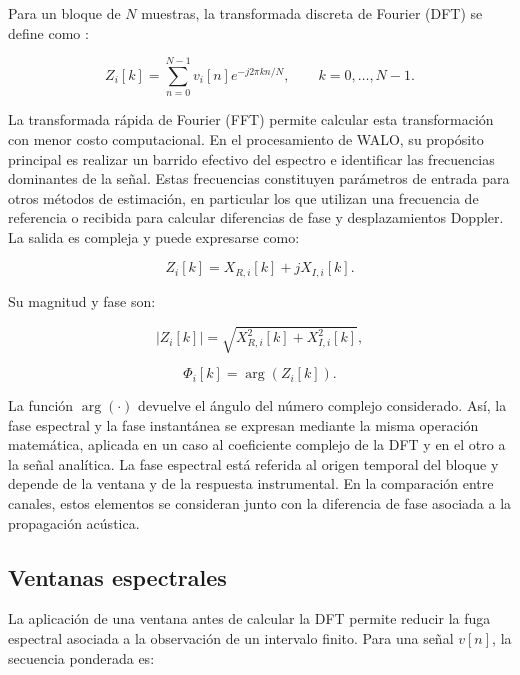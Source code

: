 Para un bloque de $N$ muestras, la transformada discreta de Fourier
(DFT) se define como
\cite{cooley1965algorithm,oppenheim1999discrete}:

\begin{equation}
    Z_i[k]
    =
    \sum_{n=0}^{N-1}
    v_i[n]e^{-j2\pi kn/N},
    \qquad
    k=0,\ldots,N-1.
    \label{eq:transformada_fourier}
\end{equation}

La transformada rápida de Fourier (FFT) permite calcular esta
transformación con menor costo computacional. En el procesamiento de
WALO, su propósito principal es realizar un barrido efectivo del
espectro e identificar las frecuencias dominantes de la señal. Estas
frecuencias constituyen parámetros de entrada para otros métodos de
estimación, en particular los que utilizan una frecuencia de referencia
o recibida para calcular diferencias de fase y desplazamientos Doppler.
La salida es compleja y puede expresarse como:

\begin{equation}
    Z_i[k]
    =
    X_{R,i}[k]+jX_{I,i}[k].
\end{equation}

Su magnitud y fase son:

\begin{equation}
    |Z_i[k]|
    =
    \sqrt{
        X_{R,i}^2[k]+X_{I,i}^2[k]
    },
    \label{eq:modulo_espectral}
\end{equation}

\begin{equation}
    \Phi_i[k]
    =
    \arg\left(Z_i[k]\right).
    \label{eq:fase_espectral}
\end{equation}

La función $\arg(\cdot)$ devuelve el ángulo del número complejo
considerado. Así, la fase espectral y la fase instantánea se expresan
mediante la misma operación matemática, aplicada en un caso al
coeficiente complejo de la DFT y en el otro a la señal analítica. La
fase espectral está referida al origen temporal del bloque y depende
de la ventana y de la respuesta instrumental. En la comparación entre
canales, estos elementos se consideran junto con la diferencia de fase
asociada a la propagación acústica.

\subsection*{Ventanas espectrales}

La aplicación de una ventana antes de calcular la DFT permite reducir
la fuga espectral asociada a la observación de un intervalo finito.
Para una señal $v[n]$, la secuencia ponderada es:

